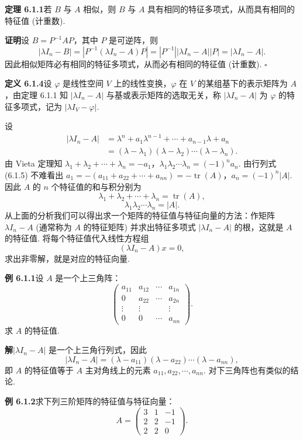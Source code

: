 \documentclass[UTF8, 12pt, fontset=fandol, oneside]{ctexart}
\begin{document}
\noindent\textbf{定理 6.1.1}\quad 若 $B$ 与 $A$ 相似，则 $B$ 与 $A$ 具有相同的特征多项式，从而具有相同的特征值 (计重数).

\noindent\textbf{证明}\quad 设 $B=P^{-1}AP$，其中 $P$ 是可逆阵，则
\[
|\lambda I_n-B|=|P^{-1}(\lambda I_n-A)P|=|P^{-1}||\lambda I_n-A||P|=|\lambda I_n-A|.
\]
因此相似矩阵必有相同的特征多项式，从而必有相同的特征值 (计重数). $\square$

\noindent\textbf{定义 6.1.4}\quad 设 $\varphi$ 是线性空间 $V$ 上的线性变换，$\varphi$ 在 $V$ 的某组基下的表示矩阵为 $A$，由定理 6.1.1 知 $|\lambda I_n-A|$ 与基或表示矩阵的选取无关，称 $|\lambda I_n-A|$ 为 $\varphi$ 的特征多项式，记为 $|\lambda I_V-\varphi|$.

设
\[
\begin{aligned}
|\lambda I_n-A|&=\lambda^n+a_1\lambda^{n-1}+\cdots+a_{n-1}\lambda+a_n\\
&=(\lambda-\lambda_1)(\lambda-\lambda_2)\cdots(\lambda-\lambda_n).
\end{aligned}
\]
由 Vieta 定理知 $\lambda_1+\lambda_2+\cdots+\lambda_n=-a_1$，$\lambda_1\lambda_2\cdots\lambda_n=(-1)^na_n$. 由行列式 (6.1.5) 不难看出 $a_1=-(a_{11}+a_{22}+\cdots+a_{nn})=-\operatorname{tr}(A)$，$a_n=(-1)^n|A|$. 因此 $A$ 的 $n$ 个特征值的和与积分别为
\[
\lambda_1+\lambda_2+\cdots+\lambda_n=\operatorname{tr}(A),
\]
\[
\lambda_1\lambda_2\cdots\lambda_n=|A|.
\]
从上面的分析我们可以得出求一个矩阵的特征值与特征向量的方法：作矩阵 $\lambda I_n-A$ (通常称为 $A$ 的特征矩阵) 并求出特征多项式 $|\lambda I_n-A|$ 的根，这就是 $A$ 的特征值. 将每个特征值代入线性方程组
\[
(\lambda I_n-A)x=0,
\]
求出非零解，就是对应的特征向量.

\noindent\textbf{例 6.1.1}\quad 设 $A$ 是一个上三角阵：
\[
\left(\begin{array}{cccc}
a_{11} & a_{12} & \cdots & a_{1n}\\
0 & a_{22} & \cdots & a_{2n}\\
\vdots & \vdots & & \vdots\\
0 & 0 & \cdots & a_{nn}
\end{array}\right).
\]
求 $A$ 的特征值.

\noindent\textbf{解}\quad $|\lambda I_n-A|$ 是一个上三角行列式，因此
\[
|\lambda I_n-A|=(\lambda-a_{11})(\lambda-a_{22})\cdots(\lambda-a_{nn}),
\]
即 $A$ 的特征值等于 $A$ 主对角线上的元素 $a_{11},a_{22},\cdots,a_{nn}$. 对下三角阵也有类似的结论.

\noindent\textbf{例 6.1.2}\quad 求下列三阶矩阵的特征值与特征向量：
\[
A=\left(\begin{array}{ccc}
3 & 1 & -1\\
2 & 2 & -1\\
2 & 2 & 0
\end{array}\right).
\]
\end{document}
